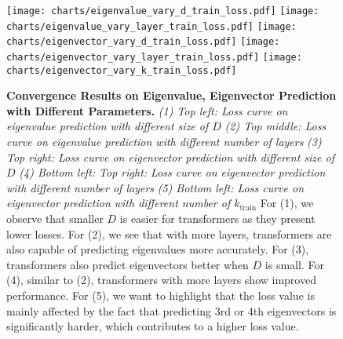 

\begin{figure}[!h]
    \centering
        \texttt{[image: charts/eigenvalue\_vary\_d\_train\_loss.pdf]}
    \endminipage\hfill
        \texttt{[image: charts/eigenvalue\_vary\_layer\_train\_loss.pdf]}
    \endminipage\hfill
        \texttt{[image: charts/eigenvector\_vary\_d\_train\_loss.pdf]}
    \endminipage\vspace{1em}
        \texttt{[image: charts/eigenvector\_vary\_layer\_train\_loss.pdf]}
    \endminipage\hfill
        \texttt{[image: charts/eigenvector\_vary\_k\_train\_loss.pdf]}
    \endminipage
    \caption{\textbf{Convergence Results on Eigenvalue, Eigenvector Prediction with Different Parameters.}
    \emph{(1) Top left: Loss curve on eigenvalue prediction with different size of $D$}
    \emph{(2) Top middle: Loss curve on eigenvalue prediction with different number of layers}
    \emph{(3) Top right: Loss curve on eigenvector prediction with different size of $D$}
    \emph{(4) Bottom left: Top right: Loss curve on eigenvector prediction with different number of layers}
    \emph{(5) Bottom left: Loss curve on eigenvector prediction with different number of $k_{\text{train}}$}
    For (1), we observe that smaller $D$ is easier for transformers as they present lower losses.
    For (2), we see that with more layers, transformers are also capable of predicting eigenvalues more accurately.
    For (3), transformers also predict eigenvectors better when $D$ is small.
    For (4), similar to (2), transformers with more layers show improved performance.
    For (5), we want to highlight that the loss value is mainly affected by the fact that predicting 3rd or 4th eigenvectors is significantly harder, which contributes to a higher loss value.
    }
    \label{fig:loss}
\end{figure}

